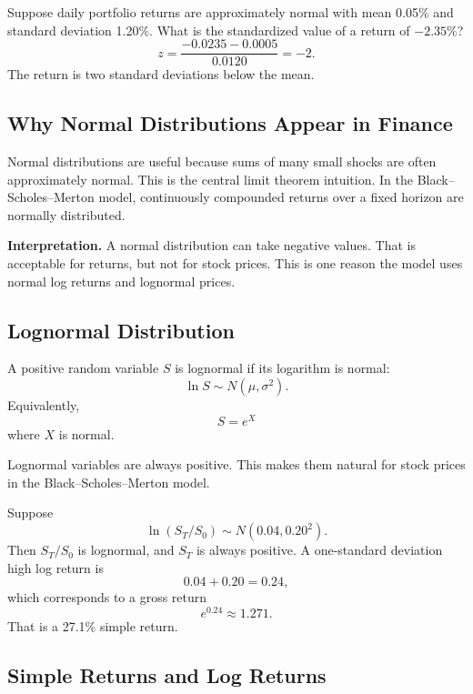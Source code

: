 \begin{exmp}[Standardization]
Suppose daily portfolio returns are approximately normal with mean 0.05\% and
standard deviation 1.20\%. What is the standardized value of a return of
$-2.35\%$?
\[
    z=\frac{-0.0235-0.0005}{0.0120}=-2.
\]
The return is two standard deviations below the mean.
\end{exmp}

\subsection{Why Normal Distributions Appear in Finance}

Normal distributions are useful because sums of many small shocks are often
approximately normal. This is the central limit theorem intuition. In the
Black--Scholes--Merton model, continuously compounded returns over a fixed
horizon are normally distributed.

\begin{boxD}
\textbf{Interpretation.} A normal distribution can take negative values. That is
acceptable for returns, but not for stock prices. This is one reason the model
uses normal log returns and lognormal prices.
\end{boxD}

\subsection{Lognormal Distribution}

A positive random variable $S$ is lognormal if its logarithm is normal:
\[
    \ln S \sim N(\mu,\sigma^2).
\]
Equivalently,
\[
    S=e^X
\]
where $X$ is normal.

Lognormal variables are always positive. This makes them natural for stock
prices in the Black--Scholes--Merton model.

\begin{exmp}
Suppose
\[
    \ln(S_T/S_0)\sim N(0.04,0.20^2).
\]
Then $S_T/S_0$ is lognormal, and $S_T$ is always positive. A one-standard
deviation high log return is
\[
    0.04+0.20=0.24,
\]
which corresponds to a gross return
\[
    e^{0.24}\approx 1.271.
\]
That is a 27.1\% simple return.
\end{exmp}

\subsection{Simple Returns and Log Returns}

